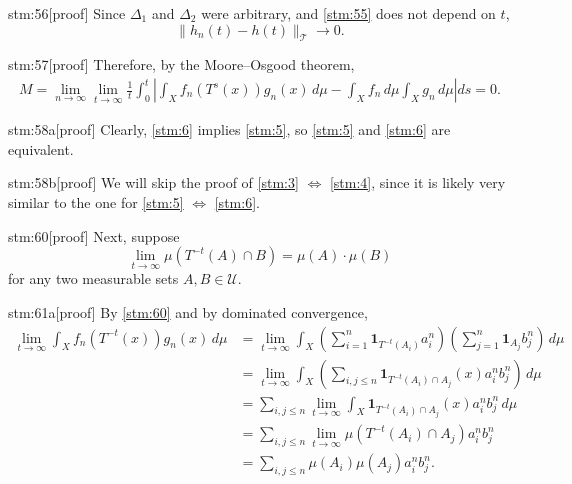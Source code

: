 \begin{stm}{stm:56}[proof]
Since $\Delta_1$ and $\Delta_2$ were arbitrary, and \ref{stm:55} does not depend on $t$, 
\[
\| h_n(t) - h(t) \|_{\mathcal{T}} \to 0.
\]
\end{stm}

\begin{stm}{stm:57}[proof]
Therefore, by the Moore–Osgood theorem,
\begin{align*}
M
= \lim_{n \to \infty} \lim_{t \to \infty} \frac{1}{t} \int_0^t 
\left| \int_X f_n(T^s(x)) g_n(x) \, d\mu 
- \int_X f_n \, d\mu \int_X g_n \, d\mu \right| ds = 0.
\end{align*}
\end{stm}

\begin{stm}{stm:58a}[proof]
Clearly, \ref{stm:6} implies \ref{stm:5}, so \ref{stm:5} and \ref{stm:6} are equivalent.
\end{stm}

\begin{stm}{stm:58b}[proof]
We will skip the proof of \ref{stm:3} $\Leftrightarrow$ \ref{stm:4}, since it is likely very similar to the one for \ref{stm:5} $\Leftrightarrow$ \ref{stm:6}. 
\end{stm}

\begin{stm}{stm:60}[proof]
Next, suppose 
\[
\lim_{t \to \infty} \mu(T^{-t}(A) \cap B) = \mu(A) \cdot \mu(B)
\]
for any two measurable sets $A, B \in \mathcal{U}$.
\end{stm}

\begin{stm}{stm:61a}[proof]
By \ref{stm:60} and by dominated convergence,
\begin{align*}
\lim_{t \to \infty} \int_X f_n(T^{-t}(x)) g_n(x) \, d\mu 
&= \lim_{t \to \infty} \int_X \left( \sum_{i=1}^n \mathbf{1}_{T^{-t}(A_i)} a_i^n \right) \left( \sum_{j=1}^n \mathbf{1}_{A_j} b_j^n \right) \, d\mu \\
&= \lim_{t \to \infty} \int_X \left( \sum_{i,j \leq n} \mathbf{1}_{T^{-t}(A_i) \cap A_j}(x) a_i^n b_j^n \right) \, d\mu \\
&= \sum_{i,j \leq n} \lim_{t \to \infty} \int_X \mathbf{1}_{T^{-t}(A_i) \cap A_j}(x) a_i^n b_j^n \, d\mu \\
&= \sum_{i,j \leq n} \lim_{t \to \infty} \mu(T^{-t}(A_i) \cap A_j) a_i^n b_j^n \\
&= \sum_{i,j \leq n} \mu(A_i) \mu(A_j) a_i^n b_j^n.
\end{align*}
\end{stm}

